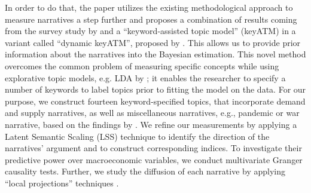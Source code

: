 In order to do that, the paper utilizes the existing methodological approach to measure narratives a step further and proposes a combination of results coming from the survey study by \cite{Andre.2023} and a ``keyword-assisted topic model'' (\textsf{keyATM}) in a variant called ``dynamic \textsf{keyATM}'', proposed by \cite{Eshima.2023}. This allows us to provide prior information about the narratives into the Bayesian estimation. This novel method overcomes the common problem of measuring specific concepts while using explorative topic models, e.g. LDA by \cite{blei.2003}; it enables the researcher to specify a number of keywords to label topics prior to fitting the model on the data. For our purpose, we construct fourteen keyword-specified topics, that incorporate demand and supply narratives, as well as miscellaneous narratives, e.g., pandemic or war narrative, based on the findings by \cite{Andre.2023}. We refine our measurements by applying a Latent Semantic Scaling (\textsf{LSS}) technique \citep{Watanabe.2021} to identify the direction of the narratives' argument and to construct corresponding indices. To investigate their predictive power over macroeconomic variables, we conduct multivariate Granger causality tests. Further, we study the diffusion of each narrative by applying ``local projections'' techniques \citep{Jorda.2005}.

